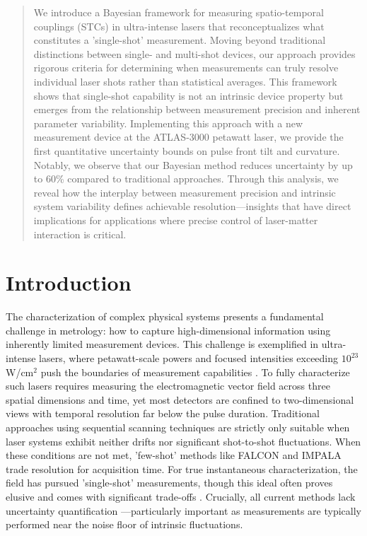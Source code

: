 \documentclass[9pt, twocolumn,superscriptaddress]{revtex4}
\begin{document}
\begin{abstract}
We introduce a Bayesian framework for measuring spatio-temporal couplings (STCs) in ultra-intense lasers that reconceptualizes what constitutes a 'single-shot' measurement. Moving beyond traditional distinctions between single- and multi-shot devices, our approach provides rigorous criteria for determining when measurements can truly resolve individual laser shots rather than statistical averages. This framework shows that single-shot capability is not an intrinsic device property but emerges from the relationship between measurement precision and inherent parameter variability. Implementing this approach with a new measurement device at the ATLAS-3000 petawatt laser, we provide the first quantitative uncertainty bounds on pulse front tilt and curvature. Notably, we observe that our Bayesian method reduces uncertainty by up to 60\% compared to traditional approaches. Through this analysis, we reveal how the interplay between measurement precision and intrinsic system variability defines achievable resolution—insights that have direct implications for applications where precise control of laser-matter interaction is critical.
\end{abstract}

\maketitle

\section{Introduction}
The characterization of complex physical systems presents a fundamental challenge in metrology: how to capture high-dimensional information using inherently limited measurement devices. This challenge is exemplified in ultra-intense lasers, where petawatt-scale powers and focused intensities exceeding $10^{23}$ W/cm$^2$ push the boundaries of measurement capabilities \cite{Danson.2015,yoon2021realization}. To fully characterize such lasers requires measuring the electromagnetic vector field across three spatial dimensions and time, yet most detectors are confined to two-dimensional views with temporal resolution far below the pulse duration.
Traditional approaches using sequential scanning techniques \cite{bowlan07,bowlan08,gallet14-2,alonso10,alonso12-1,alonso12-2,alonso13,miranda14,pariente16,borot2018spatio} are strictly only suitable when laser systems exhibit neither drifts nor significant shot-to-shot fluctuations. When these conditions are not met, 'few-shot' methods like FALCON \cite{weisse2023b} and IMPALA \cite{smartsev24} trade resolution for acquisition time. For true instantaneous characterization, the field has pursued 'single-shot' measurements, though this ideal often proves elusive and comes with significant trade-offs \cite{gabolde06,dorrer18,kim21,tang2022,howard23}. Crucially, all current methods lack uncertainty quantification \cite{alonso2024space}—particularly important as measurements are typically performed near the noise floor of intrinsic fluctuations.
\end{document}

